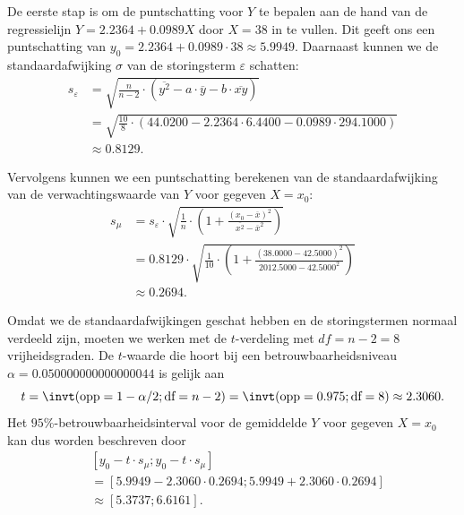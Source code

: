 \documentclass{article}
\begin{document}
        De eerste stap is om de puntschatting voor $Y$ te bepalen aan de hand van de regressielijn $Y = 2.2364+0.0989X$ door $X = 38$ in te vullen.
        Dit geeft ons een puntschatting van $y_0 = 2.2364 +0.0989 \cdot 38 \approx 5.9949$.
        Daarnaast kunnen we de standaardafwijking $\sigma$ van de storingsterm $\varepsilon$ schatten:
        \begin{align*}
            s_{\varepsilon} &= \sqrt{ \frac{n}{n-2} \cdot \left( \overline{y^2} - a \cdot \overline{y} - b \cdot \overline{xy} \right) } \\ 
                               &= \sqrt{ \frac{10}{8} \cdot \left( 44.0200 - 2.2364 \cdot 6.4400 - 0.0989 \cdot 294.1000 \right) } \\ 
                               &\approx 0.8129.
        \end{align*}

        Vervolgens kunnen we een puntschatting berekenen van de standaardafwijking van de verwachtingswaarde van $Y$ voor gegeven $X = x_0$:
        \begin{align*}
        s_{\mu}  &= s_{\varepsilon} \cdot \sqrt{ \frac{1}{n} \cdot \left( 1 + \frac{(x_0 - \overline{x})^2}{\overline{x^2} - \overline{x}^2} \right) } \\
                    &= 0.8129 \cdot \sqrt{ \frac{1}{10} \cdot \left( 1 + \frac{(38.0000 - 42.5000)^2}{2012.5000 - 42.5000^2} \right) } \\
                    &\approx 0.2694.   
        \end{align*}

        Omdat we de standaardafwijkingen geschat hebben en de storingstermen normaal verdeeld zijn, moeten we werken met de $t$-verdeling met $df = n - 2 = 8$ vrijheidsgraden.
        De $t$-waarde die hoort bij een betrouwbaarheidsniveau $\alpha = 0.050000000000000044$ is gelijk aan
        \[
            t = \invt(\text{opp} = 1 - \alpha / 2; \text{df} = n - 2) = \invt(\text{opp} = 0.975; \text{df} = 8) \approx 2.3060.
        \]
        Het $95\%$-betrouwbaarheidsinterval voor de gemiddelde $Y$ voor gegeven $X = x_0$ kan dus worden beschreven door
        \begin{align*}
            &[y_0 - t \cdot s_{\mu}; y_0 - t \cdot s_{\mu}] \\
            &= [5.9949 - 2.3060 \cdot 0.2694; 5.9949 + 2.3060 \cdot 0.2694] \\
            &\approx [5.3737; 6.6161].
        \end{align*}
        
\end{document}
